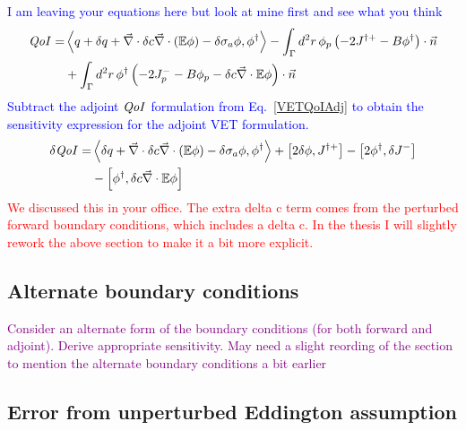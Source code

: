 \documentclass[12pt]{report}
\newcommand{\bra}{\left\langle}
\newcommand{\ket}{\right\rangle}
\newcommand{\sbra}{\left[}
\newcommand{\sket}{\right]}
\renewcommand{\div}{\vec{\nabla} \cdot}
\newcommand{\Edd}{\mathbb{E}}
\newcommand{\siga}{\sigma_a}
\newcommand{\isigt}{c}
\newcommand{\scalSource}{q}
\newcommand{\qoi}{{\it QoI}\xspace}
\newcommand{\comment}[2]{\marginpar{\textcolor{#2}{$\star$}}\textcolor{#2}{#1}\newline}
\newcommand{\iwh}[1]{\comment{#1}{red}}
\newcommand{\jcr}[1]{\comment{#1}{blue}}
\newcommand{\todo}[1]{\comment{#1}{purple}}
\newcommand{\iwh}[1]{\phantom{a}}
\newcommand{\jcr}[1]{\phantom{a}}
\newcommand{\todo}[1]{\phantom{a}}
\begin{document}
\jcr{I am leaving your equations here but look at mine first and see what you think
\begin{equation}
\begin{split}
\qoi =& \bra \scalSource + \delta \scalSource + \div \delta \isigt \div \left( \Edd \phi \right) - \delta \siga \phi, \phi^\dag \ket - \int_\Gamma d^2 r \, \phi_p \left( - 2J^{\dag +} - B \phi^\dag \right) \cdot \vec{n} 
\\ &+ \int_\Gamma d^2 r \, \phi^\dag \left( - 2J_p^- - B \phi_p - \delta \isigt \div \Edd \phi \right) \cdot \vec{n} 
\end{split}
\end{equation}
Subtract the adjoint $\qoi$ formulation from Eq.~\eqref{VETQoIAdj} to obtain the sensitivity expression for the adjoint VET formulation.
\begin{equation}
\begin{split}
\delta \qoi =& \bra \delta \scalSource + \div \delta \isigt \div \left( \Edd \phi \right) - \delta \siga \phi, \phi^\dag \ket + \sbra 2\delta \phi, J^{\dag +} \sket  - \sbra 2\phi^\dag, \delta J^- \sket
\\ &- \sbra \phi^\dag, \delta \isigt \div \Edd \phi \sket
\end{split}
\end{equation}
}
\iwh{We discussed this in your office. The extra delta c term comes from the perturbed forward boundary conditions, which includes a delta c. In the thesis I will slightly rework the above section to make it a bit more explicit.}

\subsection{Alternate boundary conditions}
\todo{Consider an alternate form of the boundary conditions (for both forward and adjoint). Derive appropriate sensitivity. May need a slight reording of the section to mention the alternate boundary conditions a bit earlier}

\subsection{Error from unperturbed Eddington assumption}
\end{document}
